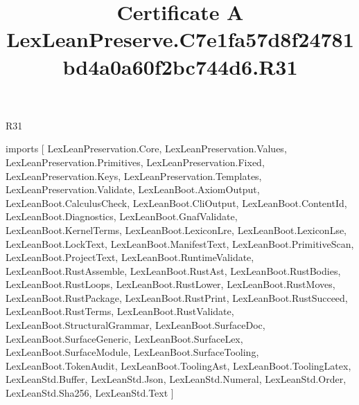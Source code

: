 \begin{lexlean}{R31}
\title{Certificate A LexLeanPreserve.C7e1fa57d8f24781bd4a0a60f2bc744d6.R31}
\begin{coremodule}
imports [
  LexLeanPreservation.Core,
  LexLeanPreservation.Values,
  LexLeanPreservation.Primitives,
  LexLeanPreservation.Fixed,
  LexLeanPreservation.Keys,
  LexLeanPreservation.Templates,
  LexLeanPreservation.Validate,
  LexLeanBoot.AxiomOutput,
  LexLeanBoot.CalculusCheck,
  LexLeanBoot.CliOutput,
  LexLeanBoot.ContentId,
  LexLeanBoot.Diagnostics,
  LexLeanBoot.GnafValidate,
  LexLeanBoot.KernelTerms,
  LexLeanBoot.LexiconLre,
  LexLeanBoot.LexiconLse,
  LexLeanBoot.LockText,
  LexLeanBoot.ManifestText,
  LexLeanBoot.PrimitiveScan,
  LexLeanBoot.ProjectText,
  LexLeanBoot.RuntimeValidate,
  LexLeanBoot.RustAssemble,
  LexLeanBoot.RustAst,
  LexLeanBoot.RustBodies,
  LexLeanBoot.RustLoops,
  LexLeanBoot.RustLower,
  LexLeanBoot.RustMoves,
  LexLeanBoot.RustPackage,
  LexLeanBoot.RustPrint,
  LexLeanBoot.RustSucceed,
  LexLeanBoot.RustTerms,
  LexLeanBoot.RustValidate,
  LexLeanBoot.StructuralGrammar,
  LexLeanBoot.SurfaceDoc,
  LexLeanBoot.SurfaceGeneric,
  LexLeanBoot.SurfaceLex,
  LexLeanBoot.SurfaceModule,
  LexLeanBoot.SurfaceTooling,
  LexLeanBoot.TokenAudit,
  LexLeanBoot.ToolingAst,
  LexLeanBoot.ToolingLatex,
  LexLeanStd.Buffer,
  LexLeanStd.Json,
  LexLeanStd.Numeral,
  LexLeanStd.Order,
  LexLeanStd.Sha256,
  LexLeanStd.Text
]


\end{coremodule}
\end{lexlean}
